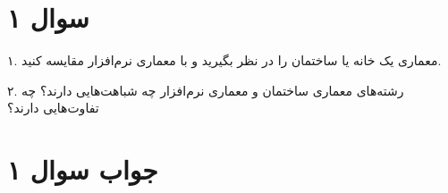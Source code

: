 \section*{سوال ۱}

۱. معماری یک خانه یا ساختمان را در نظر بگیرید و با معماری نرم‌افزار مقایسه کنید.

۲. رشته‌های معماری ساختمان و معماری نرم‌افزار چه شباهت‌هایی دارند؟ چه تفاوت‌هایی دارند؟

\section*{جواب سوال ۱}

